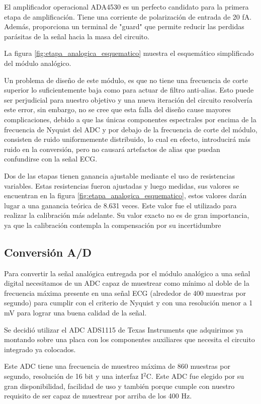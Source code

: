 \documentclass[conference]{IEEEtran}
\begin{document}
El amplificador operacional ADA4530 \cite{ada4530} es un perfecto candidato para
la primera etapa de amplificación. Tiene una corriente de polarización de entrada de
20 fA. Además, proporciona un terminal de "guard" que permite reducir las perdidas
parásitas de la señal hacia la masa del circuito.
 
La figura \ref{fig:etapa_analogica_esquematico} muestra el esquemático simplificado
del módulo analógico.

Un problema de diseño de este módulo, es que no tiene una frecuencia de corte
superior lo suficientemente baja como para actuar de filtro anti-alias. Esto
puede ser perjudicial para nuestro objetivo y una nueva iteración del circuito
resolvería este error, sin embargo, no se cree que esta falla del diseño cause
mayores complicaciones, debido a que las únicas componentes espectrales por encima
de la frecuencia de Nyquist del ADC y por debajo de la frecuencia de corte del
módulo, consisten de ruido uniformemente distribuido, lo cual en efecto, introducirá
más ruido en la conversión, pero no causará artefactos de alias que puedan
confundirse con la señal ECG.

Dos de las etapas tienen ganancia ajustable mediante el uso de resistencias
variables. Estas resistencias fueron ajustadas y luego medidas, sus valores se
encuentran en la figura \ref{fig:etapa_analogica_esquematico}, estos valores
darán lugar a una ganancia teórica de 8.631 veces. Este valor fue el utilizado para
realizar la calibración más adelante. Su valor exacto no es de gran importancia,
ya que la calibración contempla la compensación por su incertidumbre 


\subsection{Conversión A/D}

Para convertir la señal analógica entregada por el módulo analógico a una señal
digital necesitamos de un ADC capaz de muestrear como mínimo al doble de la
frecuencia máxima presente en una señal ECG (alrededor de 400 muestras por segundo)
para cumplir con el criterio de Nyquist y con una resolución menor a 1 mV para
lograr una buena calidad de la señal.


Se decidió utilizar el ADC ADS1115 de Texas Instruments \cite{ads1115} que adquirimos
ya montando sobre una placa con los componentes auxiliares que necesita el
circuito integrado ya colocados.

Este ADC tiene una frecuencia de muestreo máxima de 860 muestras por segundo, resolución
de 16 bit y una interfaz I$^2$C. Este ADC fue elegido por su gran disponibilidad,
facilidad de uso y también porque cumple con nuestro requisito de ser capaz de
muestrear por arriba de los 400 Hz.
\end{document}
